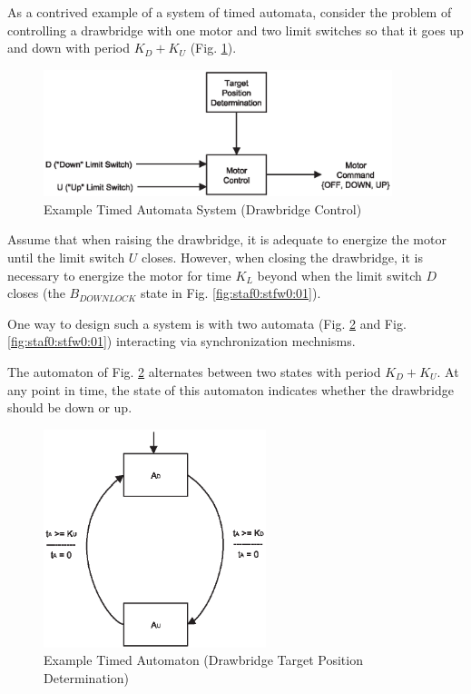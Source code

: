 \documentclass[letterpaper,10pt,titlepage]{article}
\begin{document}
As a contrived example of a system of timed automata, consider the problem of 
controlling a drawbridge with one motor and two limit switches so that it goes up and down 
with period $K_D + K_U$ (Fig. \ref{fig:staf0:stfw0:000}).

\begin{figure}
\centering
\includegraphics[width=4.0in]{system01.eps}
\caption{Example Timed Automata System (Drawbridge Control)}
\label{fig:staf0:stfw0:000}
\end{figure}

Assume that when raising the drawbridge, it is adequate to energize the motor 
until the limit switch $U$ closes.  However, when closing the drawbridge,
it is necessary to energize the motor for time $K_L$ beyond 
when the limit switch $D$ closes (the $B_{DOWNLOCK}$ state in 
Fig. \ref{fig:staf0:stfw0:01}).

One way to design such a system is with two automata
(Fig. \ref{fig:staf0:stfw0:00} and Fig. \ref{fig:staf0:stfw0:01}) interacting via
synchronization mechnisms.

The automaton of Fig. \ref{fig:staf0:stfw0:00} alternates between two
states with period $K_D + K_U$.  At any point in time, the state of this
automaton indicates whether the drawbridge should be down or up.

\begin{figure}
\centering
\includegraphics[height=2.5in]{exta01.eps}
\caption{Example Timed Automaton (Drawbridge Target Position Determination)}
\label{fig:staf0:stfw0:00}
\end{figure}
\end{document}
